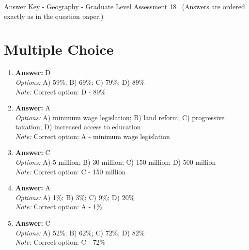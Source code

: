 \documentclass[12pt]{article}
\begin{document}
\begin{center}
Answer Key - Geography - Graduate Level Assessment 18 \
\small (Answers are ordered exactly as in the question paper.)
\end{center}

\section*{Multiple Choice}
\begin{enumerate}[label=\arabic*.]
\item \textbf{Answer:} D
\\ \textit{Options:} A) 59\%; B) 69\%; C) 79\%; D) 89\%
\\ \textit{Note:} Correct option: D - 89\%
\item \textbf{Answer:} A
\\ \textit{Options:} A) minimum wage legislation; B) land reform; C) progressive taxation; D) increased access to education
\\ \textit{Note:} Correct option: A - minimum wage legislation
\item \textbf{Answer:} C
\\ \textit{Options:} A) 5 million; B) 30 million; C) 150 million; D) 500 million
\\ \textit{Note:} Correct option: C - 150 million
\item \textbf{Answer:} A
\\ \textit{Options:} A) 1\%; B) 3\%; C) 9\%; D) 20\%
\\ \textit{Note:} Correct option: A - 1\%
\item \textbf{Answer:} C
\\ \textit{Options:} A) 52\%; B) 62\%; C) 72\%; D) 82\%
\\ \textit{Note:} Correct option: C - 72\%
\end{enumerate}
\end{document}
